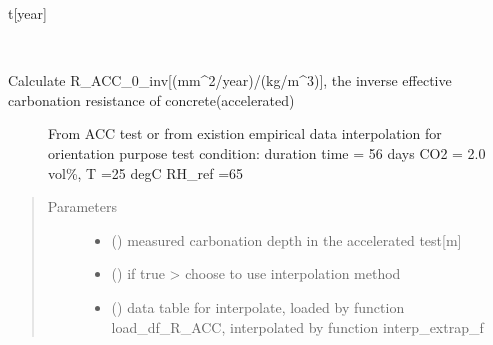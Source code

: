 \documentclass[letterpaper,10pt,english]{sphinxmanual}
\begin{document}
\begin{fulllineitems}

\begin{fulllineitems}
\label{\detokenize{carbonation:carbonation.Carbonation_Model.run}}
\sphinxAtStartPar
t{[}year{]}

\end{fulllineitems}


\end{fulllineitems}


\begin{fulllineitems}
\label{\detokenize{carbonation:carbonation.R_ACC_0_inv}}~\begin{description}
\item[{Calculate R\_ACC\_0\_inv{[}(mm\textasciicircum{}2/year)/(kg/m\textasciicircum{}3){]}, the inverse effective carbonation resistance of concrete(accelerated)}] \leavevmode
\sphinxAtStartPar
From ACC test or from existion empirical data interpolation for orientation purpose
test condition: duration time = 56 days CO2 = 2.0 vol\%, T =25 degC RH\_ref =65

\end{description}
\begin{quote}\begin{description}
\item[{Parameters}] \leavevmode\begin{itemize}
\item {} 
\sphinxAtStartPar
{} () \textendash{} measured carbonation depth in the accelerated test{[}m{]}

\item {} 
\sphinxAtStartPar
{} () \textendash{} if true \sphinxhyphen{}\textgreater{} choose to use interpolation method

\item {} 
\sphinxAtStartPar
{} () \textendash{} data table for interpolate, loaded by function load\_df\_R\_ACC, interpolated by function interp\_extrap\_f


\end{itemize}
\end{description}
\end{quote}
\end{fulllineitems}
\end{document}
